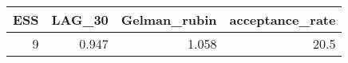 \begin{longtable}{rrrr}
\toprule
ESS & LAG\_30 & Gelman\_rubin & acceptance\_rate \\ 
\midrule
9 & 0.947 & 1.058 & 20.5 \\ 
\bottomrule
\end{longtable}

